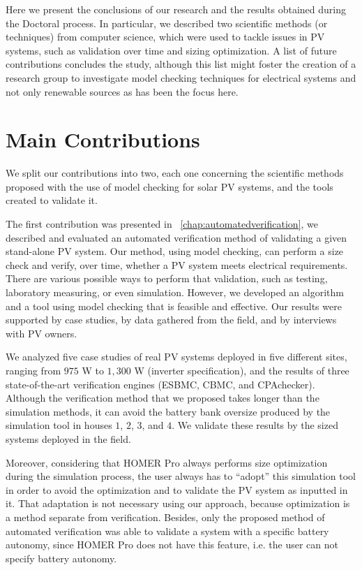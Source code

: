 Here we present the conclusions of our research and the results obtained during the Doctoral process. In particular, we described two scientific methods (or techniques) from computer science, which were used to tackle issues in PV systems, such as validation over time and sizing optimization. A list of future contributions concludes the study, although this list might foster the creation of a research group to investigate model checking techniques for electrical systems and not only renewable sources as has been the focus here.

\section{Main Contributions}

We split our contributions into two, each one concerning the scientific methods proposed with the use of model checking for solar PV systems, and the tools created to validate it.

The first contribution was presented in ~\autoref{chap:automatedverification}, we described and evaluated an automated verification method of validating a given stand-alone PV system. Our method, using model checking, can perform a size check and verify, over time, whether a PV system meets electrical requirements. There are various possible ways to perform that validation, such as testing, laboratory measuring, or even simulation. However, we developed an algorithm and a tool using model checking that is feasible and effective. Our results were supported by case studies, by data gathered from the field, and by interviews with PV owners.

We analyzed five case studies of real PV systems deployed in five different sites, ranging from $975$ W to $1,300$ W (inverter specification), and the results of three state-of-the-art verification engines (ESBMC, CBMC, and CPAchecker). Although the verification method that we proposed takes longer than the simulation methods, it can avoid the battery bank oversize produced by the simulation tool in houses $1$, $2$, $3$, and $4$. We validate these results by the sized systems deployed in the field.

Moreover, considering that HOMER Pro always performs size optimization during the simulation process, the user always has to ``adopt'' this simulation tool in order to avoid the optimization and to validate the PV system as inputted in it. That adaptation is not necessary using our approach, because optimization is a method separate from verification. Besides, only the proposed method of automated verification was able to validate a system with a specific battery autonomy, since HOMER Pro does not have this feature, i.e. the user can not specify battery autonomy.

